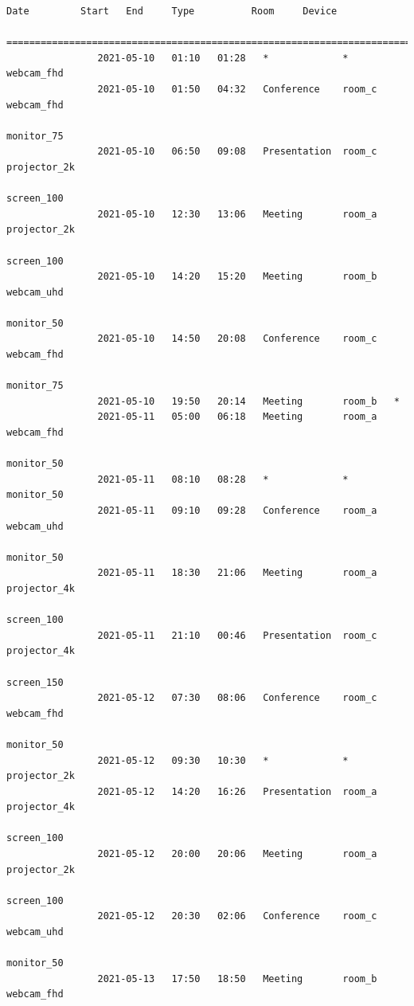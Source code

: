 \documentclass{article}
\begin{document}
\begin{Verbatim}[gobble=8]
                Date         Start   End     Type          Room     Device
                ===========================================================================
                2021-05-10   01:10   01:28   *             *        webcam_fhd
                2021-05-10   01:50   04:32   Conference    room_c   webcam_fhd
                                                                    monitor_75
                2021-05-10   06:50   09:08   Presentation  room_c   projector_2k
                                                                    screen_100
                2021-05-10   12:30   13:06   Meeting       room_a   projector_2k
                                                                    screen_100
                2021-05-10   14:20   15:20   Meeting       room_b   webcam_uhd
                                                                    monitor_50
                2021-05-10   14:50   20:08   Conference    room_c   webcam_fhd
                                                                    monitor_75
                2021-05-10   19:50   20:14   Meeting       room_b   *
                2021-05-11   05:00   06:18   Meeting       room_a   webcam_fhd
                                                                    monitor_50
                2021-05-11   08:10   08:28   *             *        monitor_50
                2021-05-11   09:10   09:28   Conference    room_a   webcam_uhd
                                                                    monitor_50
                2021-05-11   18:30   21:06   Meeting       room_a   projector_4k
                                                                    screen_100
                2021-05-11   21:10   00:46   Presentation  room_c   projector_4k
                                                                    screen_150
                2021-05-12   07:30   08:06   Conference    room_c   webcam_fhd
                                                                    monitor_50
                2021-05-12   09:30   10:30   *             *        projector_2k
                2021-05-12   14:20   16:26   Presentation  room_a   projector_4k
                                                                    screen_100
                2021-05-12   20:00   20:06   Meeting       room_a   projector_2k
                                                                    screen_100
                2021-05-12   20:30   02:06   Conference    room_c   webcam_uhd
                                                                    monitor_50
                2021-05-13   17:50   18:50   Meeting       room_b   webcam_fhd

\end{Verbatim}
\end{document}
